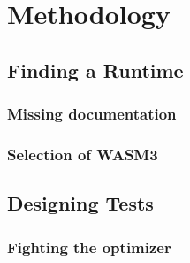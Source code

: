 
\chapter{Methodology}\label{chapter:methodology}
\section{Finding a Runtime}
\subsection{Missing documentation}
\subsection{Selection of WASM3}
\section{Designing Tests}
\subsection{Fighting the optimizer}